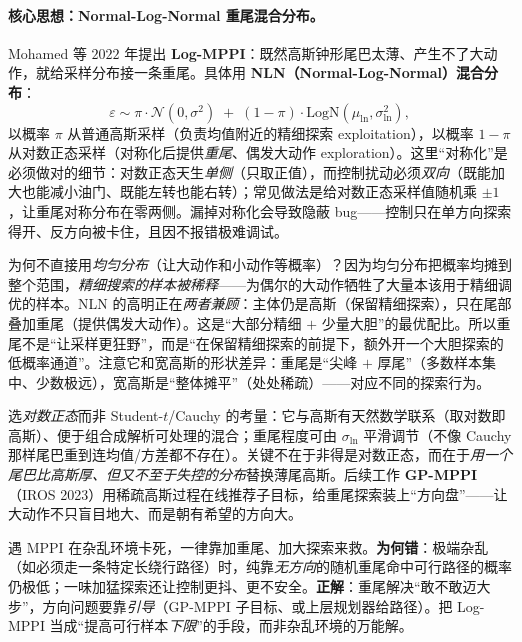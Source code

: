 \paragraph{核心思想：Normal-Log-Normal 重尾混合分布。}
Mohamed 等 $2022$ 年提出 \textbf{Log-MPPI}\cite{mohamed2022logmppi}：既然高斯钟形尾巴太薄、产生不了大动作，就给采样分布接一条重尾。具体用 \textbf{NLN（Normal-Log-Normal）混合分布}：
\begin{equation}
  \varepsilon \sim \pi\cdot\mathcal{N}(0,\sigma^2)\;+\;(1-\pi)\cdot\mathrm{LogN}(\mu_{\ln},\sigma_{\ln}^2),
  \label{eq:mv-nln}
\end{equation}
以概率 $\pi$ 从普通高斯采样（负责均值附近的精细探索 exploitation），以概率 $1-\pi$ 从对数正态采样（对称化后提供\emph{重尾}、偶发大动作 exploration）。这里“对称化”是必须做对的细节：对数正态天生\emph{单侧}（只取正值），而控制扰动必须\emph{双向}（既能加大也能减小油门、既能左转也能右转）；常见做法是给对数正态采样值随机乘 $\pm1$，让重尾对称分布在零两侧。漏掉对称化会导致隐蔽 bug——控制只在单方向探索得开、反方向被卡住，且因不报错极难调试。

\begin{insight}
为何不直接用\emph{均匀分布}（让大动作和小动作等概率）？因为均匀分布把概率均摊到整个范围，\emph{精细搜索的样本被稀释}——为偶尔的大动作牺牲了大量本该用于精细调优的样本。NLN 的高明正在\emph{两者兼顾}：主体仍是高斯（保留精细探索），只在尾部叠加重尾（提供偶发大动作）。这是“大部分精细 $+$ 少量大胆”的最优配比。所以重尾不是“让采样更狂野”，而是“在保留精细探索的前提下，额外开一个大胆探索的低概率通道”。注意它和宽高斯的形状差异：重尾是“尖峰 $+$ 厚尾”（多数样本集中、少数极远），宽高斯是“整体摊平”（处处稀疏）——对应不同的探索行为。
\end{insight}

\noindent 选\emph{对数正态}而非 Student-$t$/Cauchy 的考量：它与高斯有天然数学联系（取对数即高斯）、便于组合成解析可处理的混合；重尾程度可由 $\sigma_{\ln}$ 平滑调节（不像 Cauchy 那样尾巴重到连均值/方差都不存在）。关键不在于非得是对数正态，而在于\emph{用一个尾巴比高斯厚、但又不至于失控的分布}替换薄尾高斯。后续工作 \textbf{GP-MPPI}（IROS 2023）用稀疏高斯过程在线推荐子目标，给重尾探索装上“方向盘”——让大动作不只盲目地大、而是朝有希望的方向大\cite{mohamed2023gpmppi}。

\begin{pitfall}
遇 MPPI 在杂乱环境卡死，一律靠加重尾、加大探索来救。\textbf{为何错}：极端杂乱（如必须走一条特定长绕行路径）时，纯靠\emph{无方向}的随机重尾命中可行路径的概率仍极低；一味加猛探索还让控制更抖、更不安全。\textbf{正解}：重尾解决“敢不敢迈大步”，方向问题要靠\emph{引导}（GP-MPPI 子目标、或上层规划器给路径）。把 Log-MPPI 当成“提高可行样本\emph{下限}”的手段，而非杂乱环境的万能解。
\end{pitfall}

